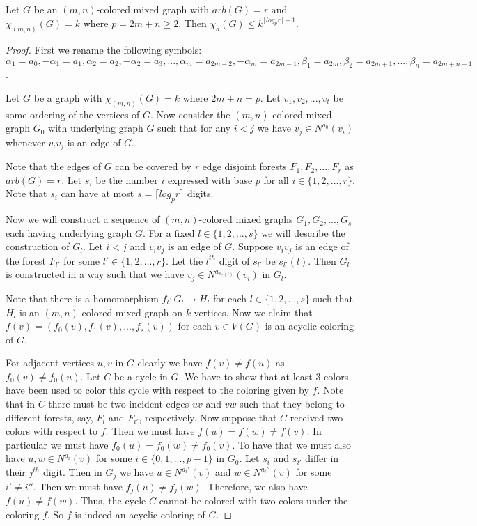 \documentclass[11pt]{article}
\begin{document}
\begin{theorem}\label{arboricity.chromatic-acyclic}
Let $G$ be an $(m,n)$-colored mixed graph with $arb(G) = r$ and $\chi_{(m,n)}(G) = k$ where $p = 2m+n \geq 2$.  Then 
$\chi_a(G) \leq k^{\lceil log_pr \rceil +1}$.
\end{theorem}




\begin{proof}
First we rename the following symbols:  
$\alpha_{1} = a_0, -\alpha_{1} = a_{1}, \alpha_2 = a_2, -\alpha_2 = a_3, ..., \alpha_m = a_{2m-2}, -\alpha_m = a_{2m-1}, \beta_1 = a_{2m}, \beta_2 = a_{2m+1},..., \beta_n = a_{2m+n-1}$.

Let $G$ be a graph with $\chi_{(m,n)}(G) = k$ where $2m+n = p$.
Let $v_1, v_2, ..., v_t$ be some ordering of the vertices of $G$. 
Now consider the $(m,n)$-colored mixed graph $G_0$ with underlying graph $G$ such that for any $i < j$ we have 
$v_j \in N^{a_0}(v_i)$ 
whenever $v_iv_j$ is 
an edge of $G$. 

Note that the edges of  $G$ can be covered by $r$ edge disjoint forests $F_1, F_2, ..., F_r$ as $arb(G) = r$. 
Let $s_i$ be the number $i$ expressed with base $p$
for all $i \in \{1,2,...,r\}$. Note that $s_i$ can have at most $s = \lceil log_pr \rceil$ digits. 


  Now we will construct a sequence of $(m,n)$-colored mixed graphs $G_1, G_2, ..., G_s$ each having underlying graph $G$. 
  For a fixed $l \in \{1,2,...,s\}$ we will describe the construction of $G_l$.   
  Let $i <j$ and $v_iv_j$ is an edge of $G$. 
  Suppose $v_iv_j$ is an edge of the forest $F_{l'}$ for some $l' \in \{1,2,...,r\}$.
  Let the $l^{th}$ digit of $s_{l'}$  be $s_{l'}(l)$. Then  $G_l$ is constructed in a way such that 
  we have $v_j \in N^{a_{s_{l'}(l)}}(v_i)$ in $G_l$.
  
  Note that there is a homomorphism  $f_l: G_l \rightarrow H_l$ for each $l \in \{1,2,...,s\}$ such that $H_l$ is 
  an $(m,n)$-colored mixed graph on $k$ vertices. 
  Now we claim that $f(v) = (f_0(v), f_1(v), ..., f_s(v))$ for each $v \in V(G)$ is an acyclic coloring of $G$. 
  
  For adjacent vertices $u,v$ in $G$ clearly we have $f(v) \neq f(u)$ as $f_0(v) \neq f_0(u)$. 
  Let $C$ be a cycle in $G$. We have to show that at least 3 colors have been used to color this cycle with respect to the coloring given by $f$. 
  Note that in $C$ there must be two incident edges $uv$ and $vw$ such that they belong to different forests, 
  say, $F_i$ and $F_{i'}$, respectively.
 Now suppose that $C$ received two colors with respect to $f$. Then we must have $f(u) = f(w) \neq f(v)$. In particular we must have 
 $f_0(u) = f_0(w) \neq f_0(v)$. 
 To have that we must also have $u,w \in N^{a_i}(v)$ for some $i \in \{0,1,...,p-1\}$ in $G_0$. 
 Let  $s_i$ and $s_{i'}$ differ in their $j^{th}$ digit. Then in $G_j$ we have $u \in N^{a_i'}(v)$ and $w \in N^{a_i''}(v)$
 for some $i' \neq i''$. Then we must have $f_j(u) \neq f_j(w)$.  Therefore, we also have $f(u) \neq f(w)$. Thus, the cycle $C$ cannot be colored with two colors under the coloring $f$. So $f$ is indeed an acyclic coloring of $G$. 
    \end{proof}
\end{document}
